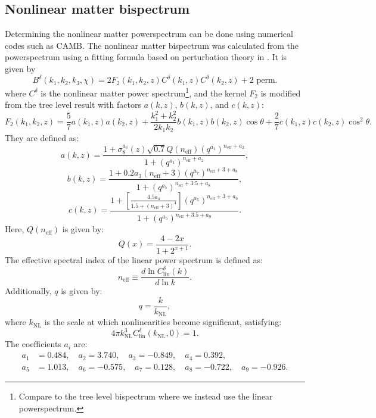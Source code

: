 \documentclass[11pt]{article} %
\begin{document}
\subsection{Nonlinear matter bispectrum}
Determining the nonlinear matter powerspectrum can be done using numerical codes such as CAMB. The nonlinear matter bispectrum was calculated from the powerspectrum using a fitting formula based on perturbation theory in \cite{bispfit}. It is given by
\begin{equation}
    B^\delta(k_1, k_2, k_3, \chi) = 2 F_2(k_1, k_2, z) C^\delta(k_1, z) C^\delta(k_2, z) + \text{2 perm.}
\end{equation}
where \( C^\delta \) is the nonlinear matter power spectrum\footnote{Compare to the tree level bispectrum where we instead use the linear powerspectrum.}, and the kernel \( F_2 \) is modified from the tree level result with factors \( a(k, z) \), \( b(k, z) \), and \( c(k, z) \):
\begin{equation}
    F_2(k_1, k_2, z) = \frac{5}{7} a(k_1, z) a(k_2, z) + \frac{k_1^2 + k_2^2}{2 k_1 k_2} b(k_1, z) b(k_2, z) \cos \theta + \frac{2}{7} c(k_1, z) c(k_2, z) \cos^2 \theta.
\end{equation}
They are defined as:
\begin{equation}
    a(k, z) = \frac{1 + \sigma_8^{a_6}(z) \sqrt{0.7} Q(n_{\text{eff}}) (q^{a_1})^{n_{\text{eff}} + a_2}}{1 + (q^{a_1})^{n_{\text{eff}} + a_2}},
\end{equation}
\begin{equation}
    b(k, z) = \frac{1 + 0.2 a_3 (n_{\text{eff}} + 3) (q^{a_7})^{n_{\text{eff}} + 3 + a_8}}{1 + (q^{a_5})^{n_{\text{eff}} + 3.5 + a_8}},
\end{equation}
\begin{equation}
    c(k, z) = \frac{1 + \left[ \frac{4.5 a_4}{1.5 + (n_{\text{eff}} + 3)^4} \right] (q^{a_5})^{n_{\text{eff}} + 3 + a_9}}{1 + (q^{a_5})^{n_{\text{eff}} + 3.5 + a_9}}.
\end{equation}
Here, \( Q(n_{\text{eff}}) \) is given by:
\begin{equation}
    Q(x) = \frac{4 - 2x}{1 + 2^{x+1}}.
\end{equation}
The effective spectral index of the linear power spectrum is defined as:
\begin{equation}
    n_{\text{eff}} \equiv \frac{d \ln C^\delta_{\text{lin}}(k)}{d \ln k}.
\end{equation}
Additionally, \( q \) is given by:
\begin{equation}
    q = \frac{k}{k_{\text{NL}}},
\end{equation}
where \( k_{\text{NL}} \) is the scale at which nonlinearities become significant, satisfying:
\begin{equation}
    4 \pi k_{\text{NL}}^3 C^\delta_{\text{lin}}(k_{\text{NL}}, 0) = 1.
\end{equation}
The coefficients \( a_i \) are:
\begin{align*}
    a_1 &= 0.484, \quad a_2 = 3.740, \quad a_3 = -0.849, \quad a_4 = 0.392, \\
    a_5 &= 1.013, \quad a_6 = -0.575, \quad a_7 = 0.128, \quad a_8 = -0.722, \quad a_9 = -0.926.
\end{align*}
\end{document}
